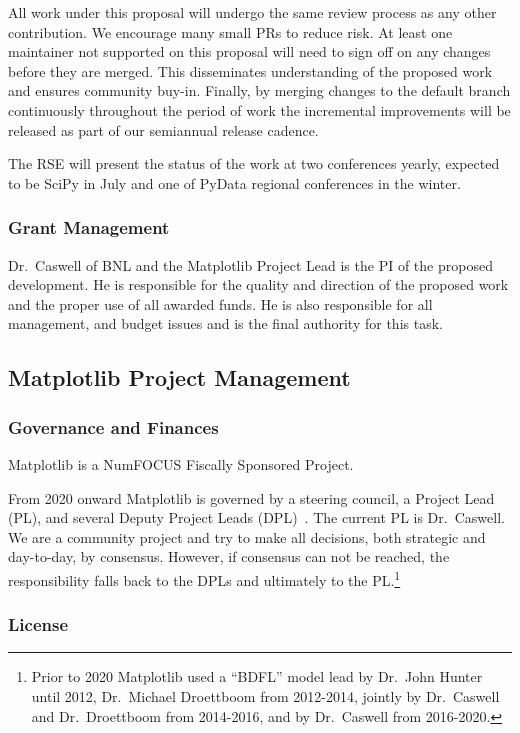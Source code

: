 \documentclass[12pt]{article}
\numberwithin{page}{section}
\begin{document}
All work under this proposal will undergo the same review process
as any other contribution.  We
encourage many small PRs to reduce risk.  At least one maintainer not
supported on this proposal
will need to sign off on any changes before they are merged. This
disseminates understanding of the proposed work and ensures
community buy-in.  Finally, by merging
changes to the default branch continuously throughout the period of
work the incremental improvements will be released as part of our
semiannual release cadence.

The RSE will present the status of the work at two conferences yearly,
expected to be SciPy in July and one of PyData regional conferences in
the winter.


\subsubsection{Grant Management}

Dr.\ Caswell of BNL and the Matplotlib Project Lead is the PI of the proposed
development.  He is responsible for the quality and direction of the proposed
work and the proper use of all awarded funds.  He is also responsible for all
management, and budget issues and is the final authority for this task.


\subsection{Matplotlib Project Management}
\subsubsection{Governance and Finances}

Matplotlib is a NumFOCUS Fiscally Sponsored Project.

From 2020 onward Matplotlib is governed by a steering council, a Project Lead
(PL), and several Deputy Project Leads (DPL)~\cite{gov}.  The current PL is
Dr.\ Caswell.  We are a community project and try to make all decisions, both
strategic and day-to-day, by consensus.  However, if consensus can not be
reached, the responsibility falls back to the DPLs and ultimately to the
PL.\footnote{Prior to 2020 Matplotlib used a ``BDFL'' model lead by Dr.\ John
Hunter until 2012, Dr.\ Michael Droettboom from 2012-2014, jointly by
Dr.\ Caswell and Dr.\ Droettboom from 2014-2016, and by Dr.\ Caswell from
2016-2020.}

\subsubsection{License}
\end{document}
